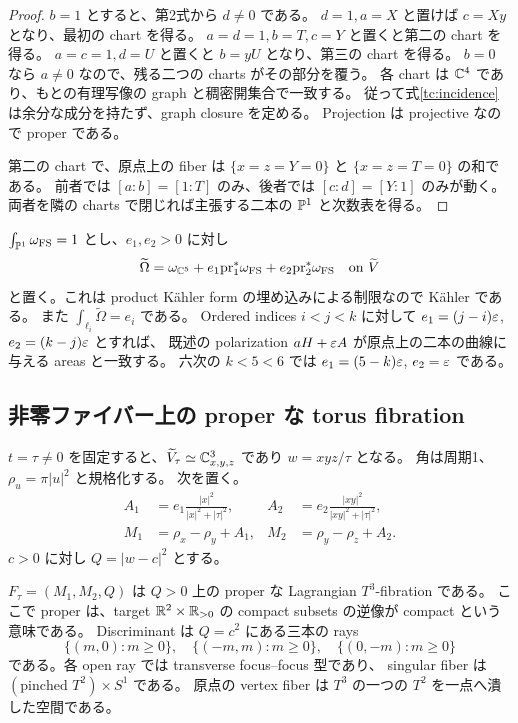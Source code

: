 \begin{proof}
$b=1$ とすると、第2式から $d\ne0$ である。
$d=1,a=X$ と置けば $c=Xy$ となり、最初の chart を得る。
$a=d=1,b=T,c=Y$ と置くと第二の chart を得る。
$a=c=1,d=U$ と置くと $b=yU$ となり、第三の chart を得る。
$b=0$ なら $a\ne0$ なので、残る二つの charts がその部分を覆う。
各 chart は $\mathbb C^4$ であり、もとの有理写像の graph と稠密開集合で一致する。
従って式\eqref{tc:incidence}は余分な成分を持たず、graph closure を定める。
Projection は projective なので proper である。

第二の chart で、原点上の fiber は
$\{x=z=Y=0\}$ と $\{x=z=T=0\}$ の和である。
前者では $[a:b]=[1:T]$ のみ、後者では $[c:d]=[Y:1]$ のみが動く。
両者を隣の charts で閉じれば主張する二本の $\mathbb P^1$ と次数表を得る。
\end{proof}

$\int_{\mathbb P^1}\omega_{\mathrm{FS}}=1$ とし、$e_1,e_2>0$ に対し
\begin{equation}\label{tc:kahler}
 \widetilde\Omega
 =\omega_{\mathbb C^5}
   +e_1\mathrm{pr}_1^*\omega_{\mathrm{FS}}
   +e_2\mathrm{pr}_2^*\omega_{\mathrm{FS}}
 \quad\text{on }\widetilde V
\end{equation}
と置く。これは product Kähler form の埋め込みによる制限なので Kähler である。
また $\int_{\ell_i}\widetilde\Omega=e_i$ である。
Ordered indices $i<j<k$ に対して $e_1=(j-i)\varepsilon$, $e_2=(k-j)\varepsilon$ とすれば、
既述の polarization $aH+\varepsilon A$ が原点上の二本の曲線に与える areas と一致する。
六次の $k<5<6$ では $e_1=(5-k)\varepsilon$, $e_2=\varepsilon$ である。

\subsection{非零ファイバー上の proper な torus fibration}

$t=\tau\ne0$ を固定すると、$\widetilde V_\tau\simeq\mathbb C^3_{x,y,z}$ であり
$w=xyz/\tau$ となる。
角は周期1、$\rho_u=\pi|u|^2$ と規格化する。
次を置く。
\begin{align}
 A_1&=e_1\frac{|x|^2}{|x|^2+|\tau|^2},&
 A_2&=e_2\frac{|xy|^2}{|xy|^2+|\tau|^2},\nonumber\\
 M_1&=\rho_x-\rho_y+A_1,&
 M_2&=\rho_y-\rho_z+A_2.\label{tc:moments}
\end{align}
$c>0$ に対し $Q=|w-c|^2$ とする。

\begin{theorem}\label{tc:fibration}
$F_\tau=(M_1,M_2,Q)$ は $Q>0$ 上の proper な Lagrangian $T^3$-fibration である。
ここで proper は、target $\mathbb R^2\times\mathbb R_{>0}$ の compact subsets の逆像が compact という意味である。
Discriminant は $Q=c^2$ にある三本の rays
\begin{equation}\label{tc:discriminant}
 \{(m,0):m\ge0\},\quad
 \{(-m,m):m\ge0\},\quad
 \{(0,-m):m\ge0\}
\end{equation}
である。各 open ray では transverse focus--focus 型であり、
singular fiber は $(\text{pinched }T^2)\times S^1$ である。
原点の vertex fiber は $T^3$ の一つの $T^2$ を一点へ潰した空間である。
\end{theorem}

